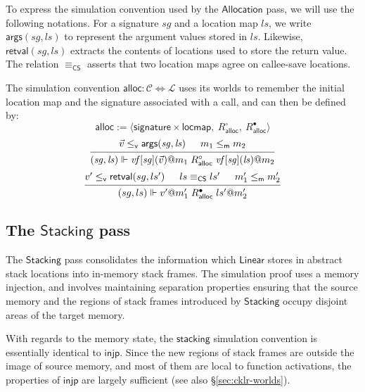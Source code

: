 \documentclass[11pt,oneside,draft]{book}
\theoremstyle{definition}
\newcommand{\kw}[1]{\ensuremath{ \mathsf{#1} }}
\newcommand{\que}{\circ}         %
\newcommand{\ans}{\bullet}       %
\newcommand{\vref}{\le_\kw{v}}   %
\newcommand{\mext}{\le_\kw{m}}   %
\begin{document}
To express the simulation convention used by the \kw{Allocation} pass,
we will use the following notations.
For a signature $\mathit{sg}$ and a location map $\mathit{ls}$,
we write $\kw{args}(\mathit{sg}, \mathit{ls})$
to represent the argument values stored in $\mathit{ls}$.
Likewise,
$\kw{retval}(\mathit{sg}, \mathit{ls})$ extracts
the contents of locations used to store the return value.
The relation $\equiv_\kw{CS}$ asserts that
two location maps agree on callee-save locations.

The simulation convention
$\kw{alloc} : \mathcal{C} \Leftrightarrow \mathcal{L}$
uses its worlds to remember the initial location map
and the signature associated with a call,
and can then be defined by:
\[
  \kw{alloc} := \langle
      \kw{signature} \times \kw{locmap}, \:
      R_\kw{alloc}^\que, \:
      R_\kw{alloc}^\ans \rangle
\]
\[
  \begin{prooftree}
  \hypo{\vec{v} \vref \kw{args}(\mathit{sg}, \mathit{ls})}
  \hypo{m_1 \mext m_2}
  \infer2{
      (\mathit{sg}, \mathit{ls}) \Vdash
      \mathit{vf}[\mathit{sg}](\vec{v})@m_1
      \mathrel{R_\kw{alloc}^\que}
      \mathit{vf}[\mathit{sg}](\mathit{ls})@m_2}
  \end{prooftree}
\]
\[
  \begin{prooftree}
  \hypo{v' \vref \kw{retval}(sg, ls')}
  \hypo{ls \equiv_\kw{CS} ls'}
  \hypo{m_1' \mext m_2'}
  \infer3{
      (sg, ls) \Vdash
      v'@m_1'
      \mathrel{R_\kw{alloc}^\ans}
      ls'@m_2'}
  \end{prooftree}
\]


\subsection{The \kw{Stacking} pass} \label{sec:stacking} %

The \kw{Stacking} pass
consolidates the information which
\kw{Linear} stores in abstract stack locations
into in-memory stack frames.
The simulation proof uses a memory injection,
and involves maintaining separation properties
ensuring that the source memory and
the regions of stack frames
introduced by \kw{Stacking}
occupy disjoint areas of the target memory.

With regards to the memory state,
the \kw{stacking} simulation convention
is essentially identical to \kw{injp}.
Since the new regions of stack frames
are outside the image of source memory,
and most of them are local to
function activations,
the properties of \kw{injp}
are largely sufficient
(see also \S\ref{sec:cklr-worlds}).
\end{document}
